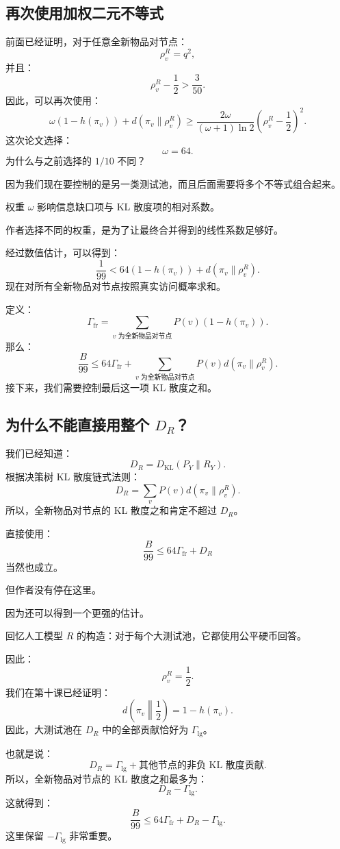 \documentclass[UTF8,11pt]{ctexart}
\begin{document}
\subsection{再次使用加权二元不等式}
前面已经证明，对于任意全新物品对节点：
\[\rho_v^R=q^2,\]
并且：
\[\rho_v^R-\frac12>\frac3{50}.\]
因此，可以再次使用：
\[\omega(1-h(\pi_v))+d(\pi_v\|\rho_v^R)\ge\frac{2\omega}{(\omega+1)\ln2}\left(\rho_v^R-\frac12\right)^2.\]
这次论文选择：
\[\omega=64.\]
为什么与之前选择的 $1/10$ 不同？

因为我们现在要控制的是另一类测试池，而且后面需要将多个不等式组合起来。

权重 $\omega$ 影响信息缺口项与 KL 散度项的相对系数。

作者选择不同的权重，是为了让最终合并得到的线性系数足够好。

经过数值估计，可以得到：
\[\frac1{99}<64(1-h(\pi_v))+d(\pi_v\|\rho_v^R).\]
现在对所有全新物品对节点按照真实访问概率求和。

定义：
\[\Gamma_{\mathrm{fr}}=\sum_{v\text{ 为全新物品对节点}}P(v)(1-h(\pi_v)).\]
那么：
\[\frac B{99}\le64\Gamma_{\mathrm{fr}}+\sum_{v\text{ 为全新物品对节点}}P(v)d(\pi_v\|\rho_v^R).\]
接下来，我们需要控制最后这一项 KL 散度之和。

\subsection{为什么不能直接用整个 $D_R$？}
我们已经知道：
\[D_R=D_{\mathrm{KL}}(P_Y\|R_Y).\]
根据决策树 KL 散度链式法则：
\[D_R=\sum_vP(v)d(\pi_v\|\rho_v^R).\]
所以，全新物品对节点的 KL 散度之和肯定不超过 $D_R$。

直接使用：
\[\frac B{99}\le64\Gamma_{\mathrm{fr}}+D_R\]
当然也成立。

但作者没有停在这里。

因为还可以得到一个更强的估计。

回忆人工模型 $R$ 的构造：对于每个大测试池，它都使用公平硬币回答。

因此：
\[\rho_v^R=\frac12.\]
我们在第十课已经证明：
\[d\left(\pi_v\middle\|\frac12\right)=1-h(\pi_v).\]
因此，大测试池在 $D_R$ 中的全部贡献恰好为 $\Gamma_{\mathrm{lg}}$。

也就是说：
\[D_R=\Gamma_{\mathrm{lg}}+\text{其他节点的非负 KL 散度贡献}.\]
所以，全新物品对节点的 KL 散度之和最多为：
\[D_R-\Gamma_{\mathrm{lg}}.\]
这就得到：
\begin{equation}
\boxed{\frac B{99}\le64\Gamma_{\mathrm{fr}}+D_R-\Gamma_{\mathrm{lg}}.}
\tag{40}
\end{equation}
这里保留 $-\Gamma_{\mathrm{lg}}$ 非常重要。
\end{document}
